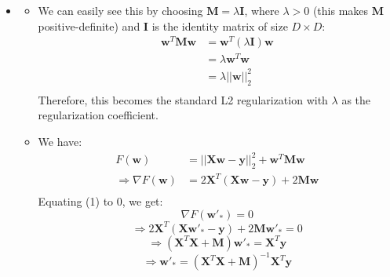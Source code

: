 \documentclass{article}
\newcommand{\mathbi}[1]{\boldsymbol{#1}}
\begin{document}
  \begin{itemize}
    \item[\textbf{2.1}]
    \begin{itemize}
      \item[1.] We can easily see this by choosing $\mathbi{M} = \lambda \mathbi{I}$, where $\lambda > 0$ (this makes $\mathbi{M}$ positive-definite) and $\mathbi{I}$ is the identity matrix of size $D \times D$:
      \begin{align*}
        \mathbi{w}^T \mathbi{M} \mathbi{w} &= \mathbi{w}^T (\lambda \mathbi{I}) \mathbi{w} \\
        &= \lambda \mathbi{w}^T \mathbi{w} \\
        &= \lambda ||\mathbi{w}||_2^2 \\
      \end{align*}
      Therefore, this becomes the standard L2 regularization with $\lambda$ as the regularization coefficient.

      \item[2.] We have:
      \begin{align*}
        F(\mathbi{w}) &= ||\mathbi{X} \mathbi{w} - \mathbi{y}||_2^2 + \mathbi{w}^T \mathbi{M} \mathbi{w} \\
        \Rightarrow \nabla F(\mathbi{w}) &= 2 \mathbi{X}^T (\mathbi{X} \mathbi{w} - \mathbi{y}) + 2 \mathbi{M} \mathbi{w} \tag{1} \\
      \end{align*}
      Equating (1) to 0, we get:
      \[ \nabla F(\mathbi{w}'_*) = 0 \]
      \[ \Rightarrow 2 \mathbi{X}^T (\mathbi{X} \mathbi{w}'_* - \mathbi{y}) + 2 \mathbi{M} \mathbi{w}'_* = 0 \]
      \[ \Rightarrow (\mathbi{X}^T \mathbi{X} + \mathbi{M}) \mathbi{w}'_* = \mathbi{X}^T \mathbi{y} \]
      \[ \Rightarrow \mathbi{w}'_* = (\mathbi{X}^T \mathbi{X} + \mathbi{M})^{-1} \mathbi{X}^T \mathbi{y} \]


\end{itemize}
\end{itemize}
\end{document}
